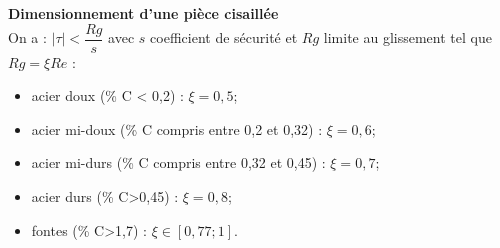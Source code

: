 \documentclass[10pt,fleqn]{article} %
\begin{document}
\begin{resultat}
\textbf{Dimensionnement d'une pièce cisaillée} ~\\
On a : $|\tau| < \dfrac{Rg}{s}$ avec $s$ coefficient de sécurité et $Rg$ limite au glissement tel que $Rg = \xi Re$ :
\begin{itemize}
\item acier doux (\% C < 0,2) : $\xi =0,5$;
\item acier mi-doux (\% C compris entre 0,2 et 0,32) : $\xi =0,6$;
\item acier mi-durs (\% C compris entre 0,32 et 0,45) : $\xi =0,7$;
\item acier durs (\% C>0,45) : $\xi =0,8$;
\item fontes (\% C>1,7) : $\xi \in [0,77;1]$.
\end{itemize}

\end{resultat}


\end{document}
